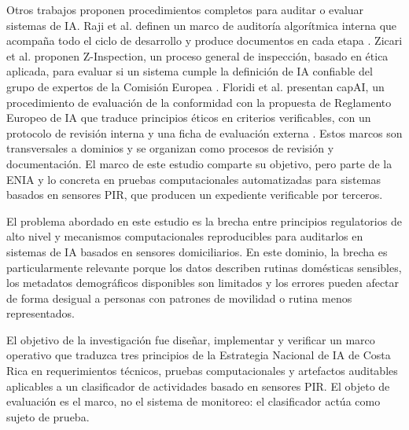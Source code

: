 Otros trabajos proponen procedimientos completos para auditar o evaluar sistemas
de IA. Raji et al. definen un marco de auditoría algorítmica interna que acompaña
todo el ciclo de desarrollo y produce documentos en cada etapa
\cite{raji2020closing}. Zicari et al. proponen Z-Inspection, un proceso general de
inspección, basado en ética aplicada, para evaluar si un sistema cumple la
definición de IA confiable del grupo de expertos de la Comisión Europea
\cite{zicari2021zinspection}. Floridi et al. presentan capAI, un procedimiento de
evaluación de la conformidad con la propuesta de Reglamento Europeo de IA que
traduce principios éticos en criterios verificables, con un protocolo de revisión
interna y una ficha de evaluación externa \cite{floridi2022capai}. Estos marcos son
transversales a dominios y se organizan como procesos de revisión y documentación.
El marco de este estudio comparte su objetivo, pero parte de la ENIA y lo concreta
en pruebas computacionales automatizadas para sistemas basados en sensores PIR, que
producen un expediente verificable por terceros.

El problema abordado en este estudio es la brecha entre principios regulatorios
de alto nivel y mecanismos computacionales reproducibles para auditarlos en
sistemas de IA basados en sensores domiciliarios. En este dominio, la brecha es
particularmente relevante porque los datos describen rutinas domésticas
sensibles, los metadatos demográficos disponibles son limitados y los errores
pueden afectar de forma desigual a personas con patrones de movilidad o rutina
menos representados.

El objetivo de la investigación fue diseñar, implementar y verificar un marco
operativo que traduzca tres principios de la Estrategia Nacional de IA de Costa
Rica en requerimientos técnicos, pruebas computacionales y artefactos auditables
aplicables a un clasificador de actividades basado en sensores PIR. El objeto
de evaluación es el marco, no el sistema de monitoreo: el clasificador actúa
como sujeto de prueba.

